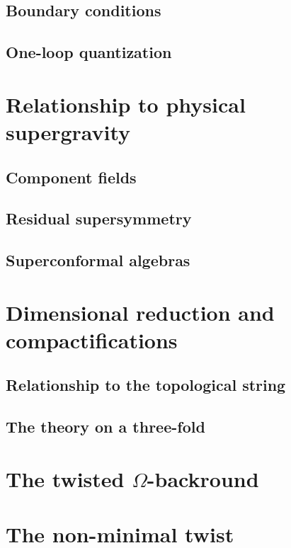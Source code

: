 \documentclass[11pt]{amsart}
\begin{document}

\subsection{Boundary conditions}


\subsection{One-loop quantization} 


\section{Relationship to physical supergravity}

\subsection{Component fields}


\subsection{Residual supersymmetry} 


\subsection{Superconformal algebras}


\section{Dimensional reduction and compactifications} 

\subsection{Relationship to the topological string}


\subsection{The theory on a three-fold}


\section{The twisted $\Omega$-backround} 

\section{The non-minimal twist} 
\end{document}
